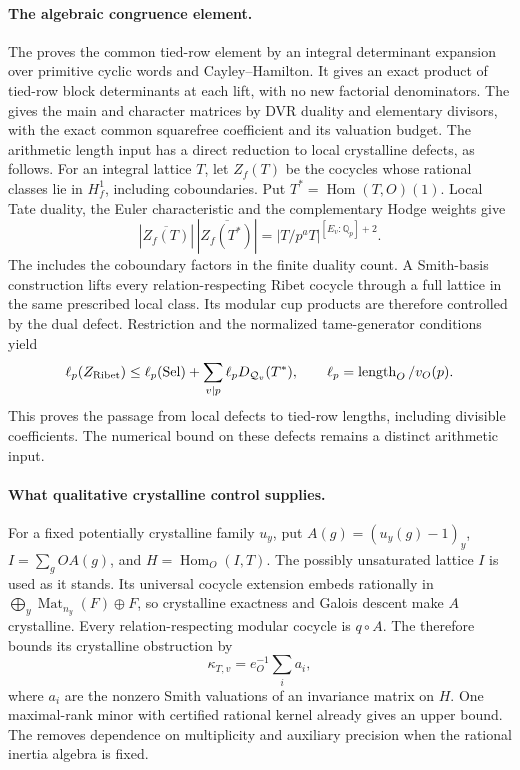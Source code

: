 \paragraph{The algebraic congruence element.}
The  proves the common tied-row element by an integral
determinant expansion over primitive cyclic words and
Cayley--Hamilton. It gives an exact product of tied-row block
determinants at each lift, with no new factorial denominators.
The  gives the main and character matrices by DVR
duality and elementary divisors, with the exact common squarefree
coefficient and its valuation budget. The arithmetic length input
has a direct reduction to local crystalline defects, as follows.
For an integral lattice \(T\), let \(Z_f(T)\) be the cocycles whose
rational classes lie in \(H_f^1\), including coboundaries. Put
\(T^*=\operatorname{Hom}(T,O)(1)\). Local Tate duality, the Euler
characteristic and the complementary Hodge weights give
\[
 |\overline{Z_f(T)}|\,|\overline{Z_f(T^*)}|
       =|T/p^aT|^{[E_v:\mathbb Q_p]+2}.
\]
The  includes the coboundary factors in the finite duality count.
A Smith-basis construction lifts every relation-respecting Ribet
cocycle through a full lattice in the same prescribed local class.
Its modular cup products are therefore controlled by the dual defect.
Restriction and the normalized tame-generator conditions yield
\[
 \ell_p(Z_{\rm Ribet})\le
 \ell_p(\mathrm{Sel})+
 \sum_{v\mid p}\ell_p D_{\mathcal Q_v}(T^*),
 \qquad \ell_p=\operatorname{length}_O/v_O(p).
\]
This proves the passage from local defects to tied-row lengths,
including divisible coefficients. The numerical bound on these
defects remains a distinct arithmetic input.

\paragraph{What qualitative crystalline control supplies.}
For a fixed potentially crystalline family \(u_y\), put
\(A(g)=(u_y(g)-1)_y\), \(I=\sum_g OA(g)\), and
\(H=\operatorname{Hom}_O(I,T)\). The possibly unsaturated lattice
\(I\) is used as it stands. Its universal cocycle extension embeds
rationally in \(\bigoplus_y\operatorname{Mat}_{n_y}(F)\oplus F\),
so crystalline exactness and Galois descent make \(A\) crystalline.
Every relation-respecting modular cocycle is \(q\circ A\).
The 
therefore bounds its crystalline obstruction by
\[
 \kappa_{T,v}=e_O^{-1}\sum_i a_i,
\]
where \(a_i\) are the nonzero Smith valuations of an invariance matrix
on \(H\). One maximal-rank minor with certified rational kernel
already gives an upper bound. The
 removes dependence on multiplicity and auxiliary precision
when the rational inertia algebra is fixed.

